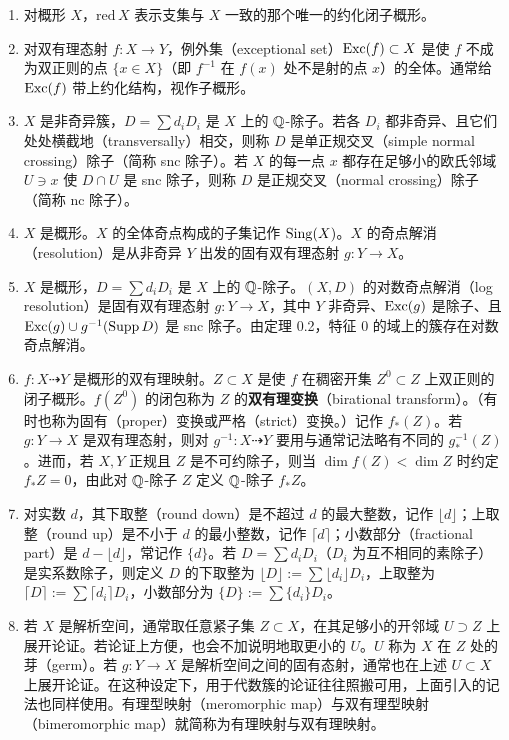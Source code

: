 \begin{enumerate}[label=(\arabic*),leftmargin=2.6em,itemsep=2pt,topsep=2pt]
\item 对概形 $X$，$\mathrm{red}\,X$ 表示支集与 $X$ 一致的那个唯一的约化闭子概形。

\item 对双有理态射 $f\colon X\to Y$，例外集（exceptional set）$\operatorname{Exc}(f)\subset X$ 是使 $f$ 不成为双正则的点 $\{x\in X\}$（即 $f^{-1}$ 在 $f(x)$ 处不是射的点 $x$）的全体。通常给 $\operatorname{Exc}(f)$ 带上约化结构，视作子概形。

\item $X$ 是非奇异簇，$D=\sum d_iD_i$ 是 $X$ 上的 $\mathbb{Q}$-除子。若各 $D_i$ 都非奇异、且它们处处横截地（transversally）相交，则称 $D$ 是单正规交叉（simple normal crossing）除子（简称 snc 除子）。若 $X$ 的每一点 $x$ 都存在足够小的欧氏邻域 $U\ni x$ 使 $D\cap U$ 是 snc 除子，则称 $D$ 是正规交叉（normal crossing）除子（简称 nc 除子）。

\item $X$ 是概形。$X$ 的全体奇点构成的子集记作 $\operatorname{Sing}(X)$。$X$ 的奇点解消（resolution）是从非奇异 $Y$ 出发的固有双有理态射 $g\colon Y\to X$。

\item $X$ 是概形，$D=\sum d_iD_i$ 是 $X$ 上的 $\mathbb{Q}$-除子。$(X,D)$ 的对数奇点解消（log resolution）是固有双有理态射 $g\colon Y\to X$，其中 $Y$ 非奇异、$\operatorname{Exc}(g)$ 是除子、且 $\operatorname{Exc}(g)\cup g^{-1}(\operatorname{Supp} D)$ 是 snc 除子。由定理 0.2，特征 $0$ 的域上的簇存在对数奇点解消。

\item $f\colon X\dashrightarrow Y$ 是概形的双有理映射。$Z\subset X$ 是使 $f$ 在稠密开集 $Z^0\subset Z$ 上双正则的闭子概形。$f(Z^0)$ 的闭包称为 $Z$ 的\textbf{双有理变换}（birational transform）。（有时也称为固有（proper）变换或严格（strict）变换。）记作 $f_*(Z)$。若 $g\colon Y\to X$ 是双有理态射，则对 $g^{-1}\colon X\dashrightarrow Y$ 要用与通常记法略有不同的 $g_*^{-1}(Z)$。进而，若 $X,Y$ 正规且 $Z$ 是不可约除子，则当 $\dim f(Z)<\dim Z$ 时约定 $f_*Z=0$，由此对 $\mathbb{Q}$-除子 $Z$ 定义 $\mathbb{Q}$-除子 $f_*Z$。

\item 对实数 $d$，其下取整（round down）是不超过 $d$ 的最大整数，记作 $\lfloor d\rfloor$；上取整（round up）是不小于 $d$ 的最小整数，记作 $\lceil d\rceil$；小数部分（fractional part）是 $d-\lfloor d\rfloor$，常记作 $\{d\}$。若 $D=\sum d_iD_i$（$D_i$ 为互不相同的素除子）是实系数除子，则定义 $D$ 的下取整为 $\lfloor D\rfloor:=\sum\lfloor d_i\rfloor D_i$，上取整为 $\lceil D\rceil:=\sum\lceil d_i\rceil D_i$，小数部分为 $\{D\}:=\sum\{d_i\}D_i$。

\item 若 $X$ 是解析空间，通常取任意紧子集 $Z\subset X$，在其足够小的开邻域 $U\supset Z$ 上展开论证。若论证上方便，也会不加说明地取更小的 $U$。$U$ 称为 $X$ 在 $Z$ 处的芽（germ）。若 $g\colon Y\to X$ 是解析空间之间的固有态射，通常也在上述 $U\subset X$ 上展开论证。在这种设定下，用于代数簇的论证往往照搬可用，上面引入的记法也同样使用。有理型映射（meromorphic map）与双有理型映射（bimeromorphic map）就简称为有理映射与双有理映射。


\end{enumerate}
